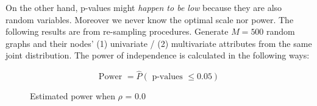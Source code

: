 \documentclass[12pt]{report}
\begin{document}
On the other hand, p-values might \textit{happen to be low} because they are also random variables. Moreover we never know the optimal scale nor power. The following results are from re-sampling procedures. Generate $M=500$ random graphs and their nodes' (1) univariate / (2) multivariate attributes from the same joint distribution. The power of independence is calculated in the following ways:


$$\mbox{Power } = \hat{P}(\mbox{ p-values } \leq 0.05)$$

\begin{figure}[H]
\captionsetup{format=plain}
\centering
{}
\caption{Estimated power when $\rho$ = 0.0}
\label{fig:power0}    
\end{figure} 
\end{document}
